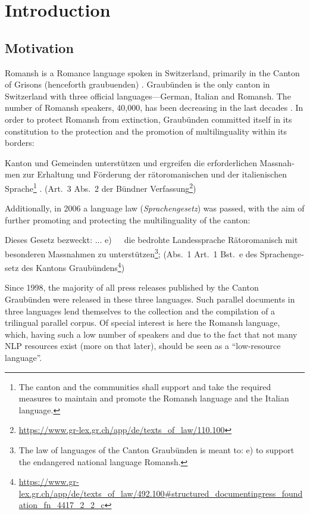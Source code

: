 \chapter{Introduction}
\section{Motivation}
Romansh is a Romance language spoken in Switzerland, primarily in the Canton of Grisons (henceforth \gls{graubuenden}) \autocite[173]{bossong2008}. 
Graubünden is the only canton in Switzerland with three official languages---German, Italian and Romansh. 
The number of Romansh speakers, 40,000, has been decreasing in the last decades \autocite{bundesamt2020}. 
In order to protect Romansh from extinction, Graubünden committed itself in its constitution to the protection and the promotion of multilinguality within its borders: 

\begin{german}
\begin{displayquote}
Kanton und Gemeinden unterstützen und ergreifen die erforderlichen Massnahmen zur Erhaltung und Förderung der rätoromanischen und der italienischen Sprache\footnote{The canton and the communities shall support and take the required measures to maintain and promote the Romansh language and the Italian language.}
. 
(Art.~3 Abs.~2 der Bündner Verfassung\footnote{\url{https://www.gr-lex.gr.ch/app/de/texts_of_law/110.100}}) 
\end{displayquote}
\end{german}

Additionally, in 2006 a language law (\emph{Sprachengesetz}) was passed, with the aim of further promoting and protecting the multilinguality of the canton:
\begin{german}
\begin{displayquote}
Dieses Gesetz bezweckt:
...
e)~~~die  bedrohte  Landessprache  Rätoromanisch  mit  besonderen  Massnahmen zu unterstützen\footnote{The law of languages of the Canton Graubünden is meant to: e) to support the endangered national language Romansh.}; (Abs.~1 Art.~1 Bst.~e des Sprachengesetz des Kantons Graubündens\footnote{\url{https://www.gr-lex.gr.ch/app/de/texts_of_law/492.100\#structured_documentingress_foundation_fn_4417_2_2_c}})
\end{displayquote}
\end{german}


Since 1998, the majority of all press releases published by the Canton Graubünden were released in these three languages. 
Such parallel documents in three languages lend themselves to the collection and the compilation of a trilingual parallel corpus. 
Of special interest is here the Romansh language, which, having such a low number of speakers and due to the fact that not many \acrfull{NLP} resources exist (more on that later), should be seen as a \enquote{low-resource language}.


